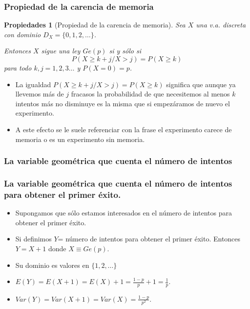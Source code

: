 \documentclass[handout]{beamer}\usepackage[]{graphicx}\usepackage[]{color}
\renewcommand{\emph}[1]{{\color{red}#1}}
\renewcommand{\geq}{\geqslant}
\theoremstyle{plain}
\newtheorem{prop}{Propiedades}
\theoremstyle{definition}
\begin{document}
\begin{frame}
\subsubsection{Propiedad de la carencia de memoria}
\begin{prop}[Propiedad de la carencia de memoria]
Sea $X$ una v.a. discreta con dominio $D_X=\{0,1,2,\ldots\}$.

Entonces $X$ sigue una ley $Ge(p)$ si y sólo si  
$$P(X\geq k+j/X> j)=P(X\geq k)$$
para todo $k,j=1,2,3\ldots$ y $P(X=0)=p$.
\end{prop}
\end{frame}

\begin{frame}

\begin{itemize}
\item  La igualdad $P(X\geq k+j/X> j)=P(X\geq k)$   significa que aunque ya llevemos más de $j$ fracasos la probabilidad de que necesitemos al menos $k$ intentos más no disminuye es la misma  que si empezáramos de nuevo el experimento. 
\item A este efecto se le suele referenciar con la frase   \emph{el experimento carece de memoria} o es un \emph{experimento sin memoria}.
\end{itemize}
\end{frame}

\begin{frame}

\subsubsection{La variable geométrica que cuenta el número de intentos}
\frametitle{La variable geométrica que cuenta el número de intentos  para obtener el
primer éxito.}

\begin{itemize}
\item Supongamos que sólo estamos interesados en el número de intentos para obtener el
primer éxito. 
\item Si definimos $Y$= número de  intentos para obtener el  primer éxito. Entonces $Y=X+1$  donde $X\equiv Ge(p)$.
\item Su dominio es
valores en $\{1,2,\ldots\}$ 
\item $E(Y)=E(X+1)=E(X)+1=\frac{1-p}{p}+1=\frac{1}{p}$.
\item $Var(Y)=Var(X+1)=Var(X)=\frac{1-p}{p^2}$.

\end{itemize}
\end{frame}
\end{document}
